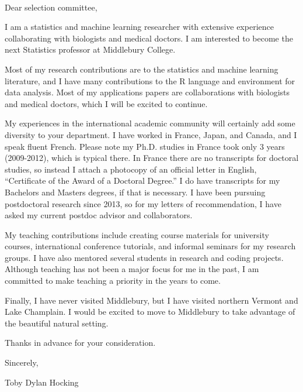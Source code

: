 \documentclass{article}
\begin{document}
\mbox{ }

Dear selection committee,

I am a statistics and machine learning researcher with extensive
experience collaborating with biologists and medical doctors. I am
interested to become the next Statistics professor at Middlebury College.

Most of my research contributions are to the statistics and
machine learning literature, and I have many contributions to the R
language and environment for data analysis. 
Most of
my applications papers are collaborations with biologists and medical
doctors, which I will be excited to continue.

My experiences in the international academic community will certainly
add some diversity to your department. I have worked in France, Japan,
and Canada, and I speak fluent French. Please note my Ph.D. studies in
France took only 3 years (2009-2012), which is typical there.
In
France there are no transcripts for doctoral studies, so instead I
attach a photocopy of an official letter in English, ``Certificate of
the Award of a Doctoral Degree.'' I do have transcripts for my
Bachelors and Masters degrees, if that is necessary. 
I have been
pursuing postdoctoral research since 2013, so for my letters of
recommendation, I have asked my current postdoc advisor and
collaborators.

My teaching contributions include creating course materials for
university courses, international conference tutorials, and informal
seminars for my research groups. I have also mentored several students
in research and coding projects. Although teaching has not been a
major focus for me in the past, I am committed to make teaching a
priority in the years to come.


Finally, I have never visited Middlebury, but I have visited northern
Vermont and Lake Champlain. I would be excited to move to Middlebury
to take advantage of the beautiful natural setting.

Thanks in advance for your consideration.

Sincerely,


Toby Dylan Hocking
\end{document}
